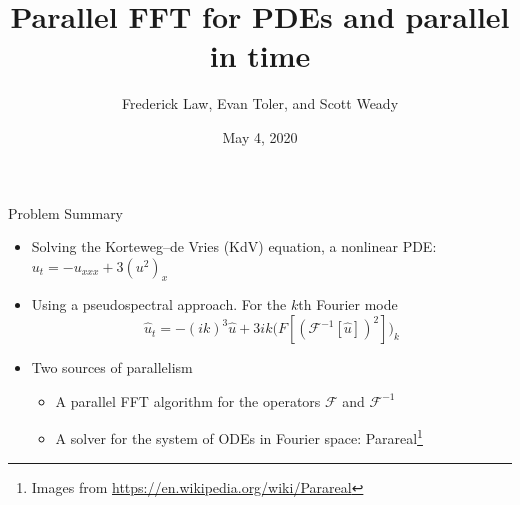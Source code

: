 \documentclass{beamer}
\title{Parallel FFT for PDEs and parallel in time}
\author{Frederick Law, Evan Toler, and Scott Weady}
\date{May 4, 2020}
\begin{document}
\begin{frame} %
  \titlepage
\end{frame}



\begin{frame}{Problem Summary} %

\begin{itemize}
  \item Solving the Korteweg–de Vries (KdV) equation, a nonlinear PDE: 
  $u_t = -u_{xxx} + 3(u^2)_x$
  \pause
  \item Using a pseudospectral approach. For the $k$th Fourier mode
  \begin{equation*}
  \widehat u_t = -(ik)^3\widehat u 
    + 3ik \mathcal (F[(\mathcal F^{-1}[\widehat u])^2])_k
  \end{equation*}
  \pause
  \item Two sources of parallelism
  \begin{itemize}
      \item A parallel FFT algorithm for the operators $\mathcal F$ and $\mathcal F^{-1}$
      \item A solver for the system of ODEs in Fourier space: Parareal\footnote{Images 
      from \url{https://en.wikipedia.org/wiki/Parareal}}
  \end{itemize}
\end{itemize}


\end{frame}
\end{document}

